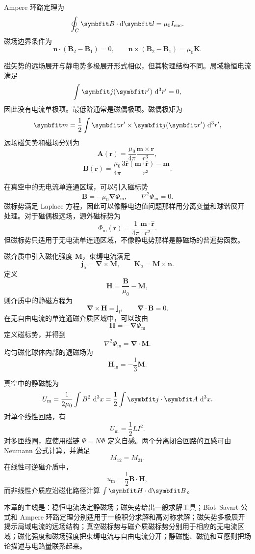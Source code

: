 Ampere 环路定理为
\[
\oint_{C}\bm{B}\cdot\dif\bm{l}
=
\mu_{0}I_{\mathrm{enc}}.
\]
磁场边界条件为
\[
\bm{n}\cdot(\bm{B}_{2}-\bm{B}_{1})=0,
\qquad
\bm{n}\times(\bm{B}_{2}-\bm{B}_{1})
=
\mu_{0}\bm{K}.
\]

磁矢势的远场展开与静电势多极展开形式相似，但其物理结构不同。局域稳恒电流满足
\[
\int
\bm{j}(\bm{r}')
\,\dif^{3}r'
=
0,
\]
因此没有电流单极项。最低阶通常是磁偶极项。磁偶极矩为
\[
\bm{m}
=
\frac{1}{2}
\int
\bm{r}'\times\bm{j}(\bm{r}')
\,\dif^{3}r',
\]
远场磁矢势和磁场分别为
\[
\bm{A}(\bm{r})
=
\frac{\mu_{0}}{4\pi}
\frac{\bm{m}\times\bm{r}}{r^{3}},
\]
\[
\bm{B}(\bm{r})
=
\frac{\mu_{0}}{4\pi}
\frac{
	3\hat{\bm{r}}(\bm{m}\cdot\hat{\bm{r}})
	-
	\bm{m}
}{r^{3}}.
\]

在真空中的无电流单连通区域，可以引入磁标势
\[
\bm{B}
=
-\mu_{0}\bm{\nabla}\Phi_{\mathrm{m}},
\qquad
\nabla^{2}\Phi_{\mathrm{m}}=0.
\]
磁标势满足 Laplace 方程，因此可以像静电边值问题那样用分离变量和球谐展开处理。对于磁偶极远场，源外磁标势为
\[
\Phi_{\mathrm{m}}(\bm{r})
=
\frac{1}{4\pi}
\frac{\bm{m}\cdot\hat{\bm{r}}}{r^{2}}.
\]
但磁标势只适用于无电流单连通区域，不像静电势那样是静磁场的普遍势函数。

磁介质中引入磁化强度 $\bm{M}$，束缚电流满足
\[
\bm{j}_{\mathrm{b}}
=
\bm{\nabla}\times\bm{M},
\qquad
\bm{K}_{\mathrm{b}}
=
\bm{M}\times\bm{n}.
\]
定义
\[
\bm{H}
=
\frac{\bm{B}}{\mu_{0}}
-
\bm{M},
\]
则介质中的静磁方程为
\[
\bm{\nabla}\times\bm{H}
=
\bm{j}_{\mathrm{f}},
\qquad
\bm{\nabla}\cdot\bm{B}=0.
\]
在无自由电流的单连通磁介质区域中，可以改由
\[
\bm{H}
=
-\bm{\nabla}\Phi_{\mathrm{m}}
\]
定义磁标势，并得到
\[
\nabla^{2}\Phi_{\mathrm{m}}
=
\bm{\nabla}\cdot\bm{M}.
\]
均匀磁化球体内部的退磁场为
\[
\bm{H}_{\mathrm{in}}
=
-\frac{1}{3}\bm{M}.
\]

真空中的静磁能为
\[
U_{\mathrm{m}}
=
\frac{1}{2\mu_{0}}
\int
B^{2}\,\dif^{3}x
=
\frac{1}{2}
\int
\bm{j}\cdot\bm{A}\,\dif^{3}x.
\]
对单个线性回路，有
\[
U_{\mathrm{m}}
=
\frac{1}{2}LI^{2}.
\]
对多匝线圈，应使用磁链 $\Psi=N\Phi$ 定义自感。两个分离闭合回路的互感可由 Neumann 公式计算，并满足
\[
M_{12}=M_{21}.
\]
在线性可逆磁介质中，
\[
u_{\mathrm{m}}
=
\frac{1}{2}\bm{B}\cdot\bm{H},
\]
而非线性介质应沿磁化路径计算
$\int\bm{H}\cdot\dif\bm{B}$。

本章的主线是：稳恒电流决定静磁场；磁矢势给出一般求解工具；Biot--Savart 公式和 Ampere 环路定理分别适用于一般积分求解和高对称求解；磁矢势多极展开揭示局域电流的远场结构；真空磁标势与磁介质磁标势分别用于相应的无电流区域；磁化强度和磁场强度把束缚电流与自由电流分开；静磁能、磁链和互感则把场论描述与电路量联系起来。
